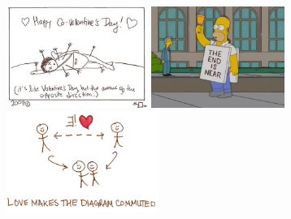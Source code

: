 \documentclass{uebblatt}
\begin{document}
\vspace{-1em}
\centering
\href{https://topologicalmusings.wordpress.com/2009/02/14/happy-co-valentines-day/}{\includegraphics[height=3.3cm]{images/happy-co-valentine}}
\includegraphics[height=3.3cm]{images/homer-the-end}
\href{http://brownsharpie.courtneygibbons.org/?p=1253}{\includegraphics[height=3.3cm]{images/love-commute}}
\par
\end{document}
